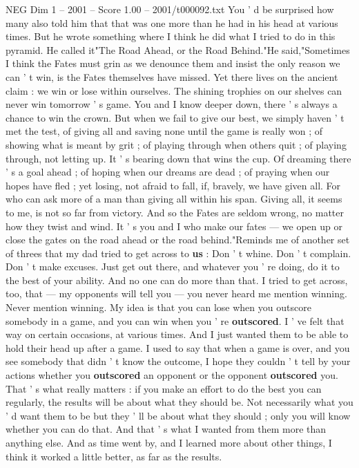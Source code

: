\begin{textsample}{NEG Dim 1 – 2001 – Score 1.00 – 2001/t000092.txt}
You ' d be surprised how many also told him that that was one more than he had in his head at various times.
But he wrote something where I think he did what I tried to do in this pyramid.
He called it"The Road Ahead, or the Road Behind."He said,"Sometimes I think the Fates must grin as we denounce them and insist the only reason we can ' t win, is the Fates themselves have missed.
Yet there lives on the ancient claim : we win or lose within ourselves.
The shining trophies on our shelves can never win tomorrow ' s game.
You and I know deeper down, there ' s always a chance to win the crown.
But when we fail to give our best, we simply haven ' t met the test, of giving all and saving none until the game is really won ; of showing what is meant by grit ; of playing through when others quit ; of playing through, not letting up.
It ' s bearing down that wins the cup.
Of dreaming there ' s a goal ahead ; of hoping when our dreams are dead ; of praying when our hopes have fled ; yet losing, not afraid to fall, if, bravely, we have given all.
For who can ask more of a man than giving all within his span.
Giving all, it seems to me, is not so far from victory.
And so the Fates are seldom wrong, no matter how they twist and wind.
It ' s you and I who make our fates — we open up or close the gates on the road ahead or the road behind."Reminds me of another set of threes that my dad tried to get across to \textbf{us} : Don ' t whine.
Don ' t complain.
Don ' t make excuses.
Just get out there, and whatever you ' re doing, do it to the best of your ability.
And no one can do more than that.
I tried to get across, too, that — my opponents will tell you — you never heard me mention winning.
Never mention winning.
My idea is that you can lose when you outscore somebody in a game, and you can win when you ' re \textbf{outscored}.
I ' ve felt that way on certain occasions, at various times.
And I just wanted them to be able to hold their head up after a game.
I used to say that when a game is over, and you see somebody that didn ' t know the outcome, I hope they couldn ' t tell by your actions whether you \textbf{outscored} an opponent or the opponent \textbf{outscored} you.
That ' s what really matters : if you make an effort to do the best you can regularly, the results will be about what they should be.
Not necessarily what you ' d want them to be but they ' ll be about what they should ; only you will know whether you can do that.
And that ' s what I wanted from them more than anything else.
And as time went by, and I learned more about other things, I think it worked a little better, as far as the results.

\end{textsample}
